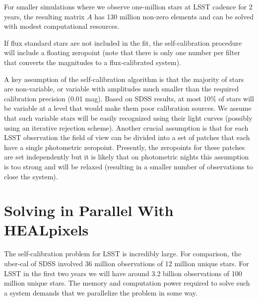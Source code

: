\documentclass[12pt,preprint]{aastex}
\begin{document}
For smaller simulations where we observe one-million stars at LSST
cadence for 2 years, the resulting matrix $A$ has 130 million non-zero
elements and can be solved with modest computational resources.


If flux standard stars are not included in the fit, the
self-calibration procedure will include a floating zeropoint (note
that there is only one number per filter that converts the magnitudes
to a flux-calibrated system).  



A key assumption of the self-calibration algorithm is that the
majority of stars are non-variable, or variable with amplitudes much
smaller than the required calibration precision (0.01 mag). Based on
SDSS results, at most 10\% of stars will be variable at a level that
would make them poor calibration sources.  We assume that such
variable stars will be easily recognized using their light curves
(possibly using an iterative rejection scheme).  Another crucial
assumption is that for each LSST observation the field of view can be
divided into a set of patches that each have a single photometric
zeropoint. Presently, the zeropoints for these patches are set
independently but it is likely that on photometric nights this
assumption is too strong and will be relaxed (resulting in a smaller
number of observations to close the system).



\section{Solving in Parallel With HEALpixels}\label{sec:hp}

The self-calibration problem for LSST is incredibly large.  For comparison, the uber-cal of SDSS involved 36 million observations of 12 million unique stars.  For LSST in the first two years we will have around 3.2 billion observations of 100 million unique stars.  The memory and computation power required to solve such a system demands that we parallelize the problem in some way.
\end{document}
